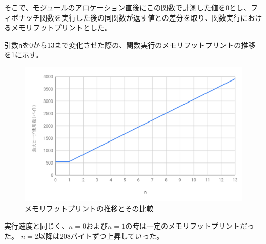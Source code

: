 そこで、モジュールのアロケーション直後にこの関数で計測した値を0とし、フィボナッチ関数を実行した後の同関数が返す値との差分を取り、関数実行におけるメモリフットプリントとした。

引数\verb|n|を0から13まで変化させた際の、関数実行のメモリフットプリントの推移を\ref{fig:heap_size}に示す。

\begin{figure}[htbp]
  \caption{メモリフットプリントの推移とその比較}
  \label{fig:heap_size}
  \begin{center}
    \includegraphics[bb=0 0 600 370,width=12cm]{img/heap_size.pdf}
  \end{center}
\end{figure}

実行速度と同じく、$n=0$および$n=1$の時は一定のメモリフットプリントだった。
$n=2$以降は208バイトずつ上昇していった。
